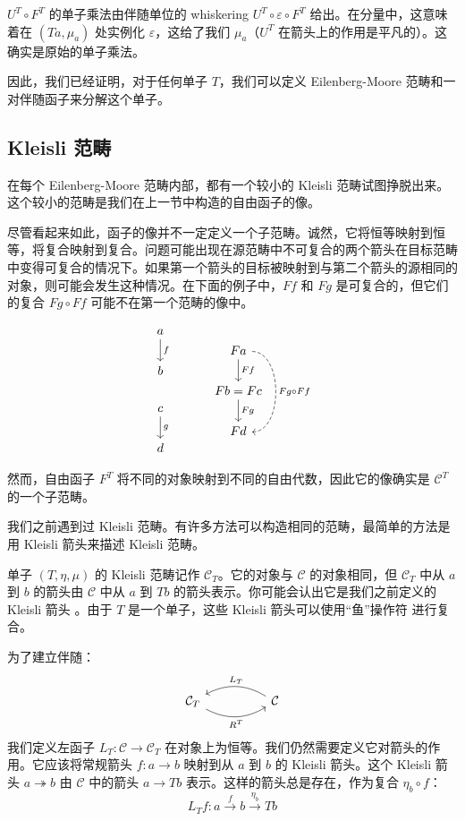 \documentclass[DaoFP]{subfiles}
\begin{document}
$U^T \circ F^T$ 的单子乘法由伴随单位的 whiskering $U^T \circ \varepsilon \circ F^T$ 给出。在分量中，这意味着在 $(T a, \mu_a)$ 处实例化 $\varepsilon$，这给了我们 $\mu_a$（$U^T$ 在箭头上的作用是平凡的）。这确实是原始的单子乘法。

因此，我们已经证明，对于任何单子 $T$，我们可以定义 Eilenberg-Moore 范畴和一对伴随函子来分解这个单子。

\subsection{Kleisli 范畴}

在每个 Eilenberg-Moore 范畴内部，都有一个较小的 Kleisli 范畴试图挣脱出来。这个较小的范畴是我们在上一节中构造的自由函子的像。

尽管看起来如此，函子的像并不一定定义一个子范畴。诚然，它将恒等映射到恒等，将复合映射到复合。问题可能出现在源范畴中不可复合的两个箭头在目标范畴中变得可复合的情况下。如果第一个箭头的目标被映射到与第二个箭头的源相同的对象，则可能会发生这种情况。在下面的例子中，$F f$ 和 $F g$ 是可复合的，但它们的复合 $F g \circ F f$ 可能不在第一个范畴的像中。

\[
 \begin{tikzcd}
 a
 \arrow[d, "f"]
 \\ b
 \\ c
 \arrow[d, "g"]
 \\ d
 \end{tikzcd}
  \hspace{30pt}
 \begin{tikzcd}
 F a
 \arrow[d, "F f"]
 \arrow[dd, dashed, bend left=90, "F g \circ F f"]
 \\ F b = F c
  \arrow[d, "F g"]
 \\ F d
 \end{tikzcd}
\]

然而，自由函子 $F^T$ 将不同的对象映射到不同的自由代数，因此它的像确实是 $\mathcal{C}^T$ 的一个子范畴。

我们之前遇到过 Kleisli 范畴。有许多方法可以构造相同的范畴，最简单的方法是用 Kleisli 箭头来描述 Kleisli 范畴。

单子 $(T, \eta, \mu)$ 的 Kleisli 范畴记作 $\mathcal{C}_T$。它的对象与 $\mathcal{C}$ 的对象相同，但 $\mathcal{C}_T$ 中从 $a$ 到 $b$ 的箭头由 $\mathcal{C}$ 中从 $a$ 到 $T b$ 的箭头表示。你可能会认出它是我们之前定义的 Kleisli 箭头 。由于 $T$ 是一个单子，这些 Kleisli 箭头可以使用“鱼”操作符 \hask{<=<} 进行复合。

为了建立伴随：
\[
 \begin{tikzcd}
   \mathcal{C}_T
    \arrow[rr, bend right, "R^T"']
&&
  \mathcal{C}
  \arrow[ll, bend right, "L_T"']
 \end{tikzcd}
\]
我们定义左函子 $L_T \colon \mathcal{C} \to \mathcal{C}_T$ 在对象上为恒等。我们仍然需要定义它对箭头的作用。它应该将常规箭头 $f \colon a \to b$ 映射到从 $a$ 到 $b$ 的 Kleisli 箭头。这个 Kleisli 箭头 $a \twoheadrightarrow b$ 由 $\mathcal{C}$ 中的箭头 $a \to T b$ 表示。这样的箭头总是存在，作为复合 $\eta_b \circ f$：
\[ L_T f \colon a \xrightarrow{f} b \xrightarrow{\eta_b} T b\]
\end{document}

